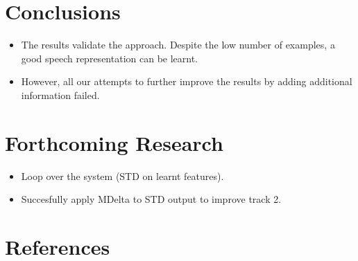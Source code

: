 \documentclass[final]{beamer}
\begin{document}
\begin{frame}[t]
\begin{multicols}{3}

\section{Conclusions}

\begin{itemize}
\item The results validate the approach. Despite the low number of examples, a good speech representation can be learnt.\\
\item However, all our attempts to further improve the results by adding additional information failed.
\end{itemize}



\section{Forthcoming Research}

\begin{itemize}
\item Loop over the system (STD on learnt features).
\item Succesfully apply MDelta to STD output to improve track 2.
\end{itemize}


\section{References}

\nocite{*} %



\end{multicols}
\end{frame}
\end{document}

